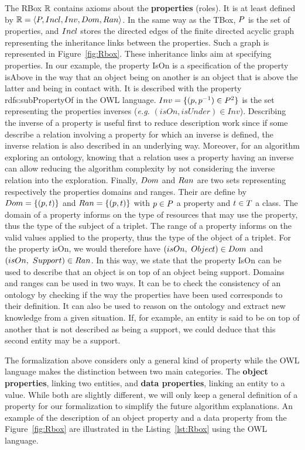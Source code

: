 The RBox $\mathbb{R}$ contains axioms about the \textbf{properties} (roles). It is at least defined by $\mathbb{R} = \langle P, Incl, Inv, Dom, Ran \rangle$. In the same way as the TBox, $P$ is the set of properties, and $Incl$ stores the directed edges of the finite directed acyclic graph representing the inheritance links between the properties. Such a graph is represented in Figure~\ref{fig:Rbox}. These inheritance links aim at specifying properties. In our example, the property IsOn is a specification of the property isAbove in the way that an object being on another is an object that is above the latter and being in contact with. It is described with the property rdfs:subPropertyOf in the OWL language. 
$Inv = \{(p, p^{-1}) \in P^2\}$ is the set representing the properties inverses (\textit{e.g.} $(isOn, isUnder) \in Inv$). Describing the inverse of a property is useful first to reduce description work since if some describe a relation involving a property for which an inverse is defined, the inverse relation is also described in an underlying way. Moreover, for an algorithm exploring an ontology, knowing that a relation uses a property having an inverse can allow reducing the algorithm complexity by not considering the inverse relation into the exploration.
Finally, $Dom$ and $Ran$ are two sets representing respectively the properties domains and ranges. Their are define by $Dom = \{(p, t)\}$ and $Ran = \{(p, t)\}$ with $p \in P$ a property and $t \in T$ a class. The domain of a property informs on the type of resources that may use the property, thus the type of the subject of a triplet. The range of a property informs on the valid values applied to the property, thus the type of the object of a triplet. For the property isOn, we would therefore have $(isOn,\ Object) \in Dom$ and $(isOn,\ Support) \in Ran$. In this way, we state that the property IsOn can be used to describe that an object is on top of an object being support. Domains and ranges can be used in two ways. It can be to check the consistency of an ontology by checking if the way the properties have been used corresponds to their definition. It can also be used to reason on the ontology and extract new knowledge from a given situation. If, for example, an entity is said to be on top of another that is not described as being a support, we could deduce that this second entity may be a support.

The formalization above considers only a general kind of property while the OWL language makes the distinction between two main categories. The \textbf{object properties}, linking two entities, and \textbf{data properties}, linking an entity to a value. While both are slightly different, we will only keep a general definition of a property for our formalization to simplify the future algorithm explanations. An example of the description of an object property and a data property from the Figure~\ref{fig:Rbox} are illustrated in the Listing~\ref{lst:Rbox} using the OWL language.


